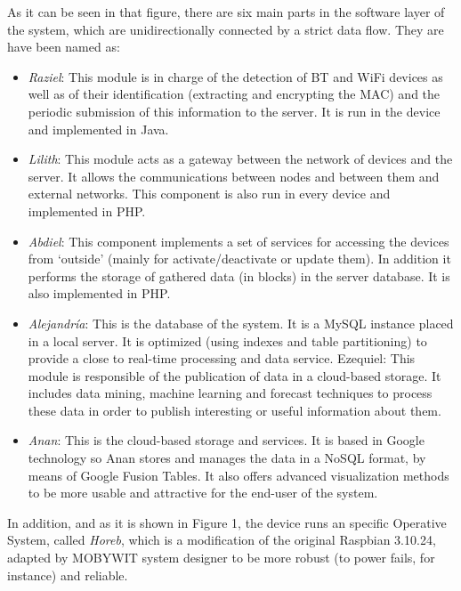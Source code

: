 \documentclass[preprint]{elsarticle}
\begin{document}
As it can be seen in that figure, there are six main parts in the software layer of the system, which are unidirectionally connected by a strict data flow. They are have been named as:
\begin{itemize}

\item \textit{Raziel}: This module is in charge of the detection of BT and WiFi devices as well as of their identification (extracting and encrypting the MAC) and the periodic submission of this information to the server. It is run in the device and implemented in Java.

\item \textit{Lilith}: This module acts as a gateway between the network of devices and the server. It allows the communications between nodes and between them and external networks. This component is also run in every device and implemented in PHP.

\item \textit{Abdiel}: This component implements a set of services for accessing the devices from `outside' (mainly for activate/deactivate or update them). In addition it performs the storage of gathered data (in blocks) in the server database. It is also implemented in PHP.

\item \textit{Alejandría}: This is the database of the system. It is a MySQL instance placed in a local server. It is optimized (using indexes and table partitioning) to provide a close to real-time processing and data service.
Ezequiel: This module is responsible of the publication of data in a cloud-based storage. It includes data mining, machine learning and forecast techniques to process these data in order to publish interesting or useful information about them.

\item \textit{Anan}: This is the cloud-based storage and services. It is based in Google technology so Anan stores and manages the data in a NoSQL format, by means of Google Fusion Tables. It also offers advanced visualization methods to be more usable and attractive for the end-user of the system.

\end{itemize}

In addition, and as it is shown in Figure 1, the device runs an specific Operative System, called \textit{Horeb}, which is a modification of the original Raspbian 3.10.24, adapted by MOBYWIT system designer to be more robust (to power fails, for instance) and reliable.
\end{document}
